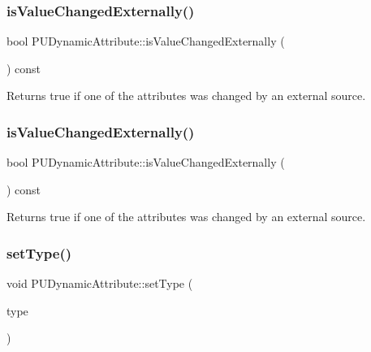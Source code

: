 \mbox{\label{classPUDynamicAttribute_adcf769af69d3508302426d751646425f}} 
\subsubsection{\texorpdfstring{is\+Value\+Changed\+Externally()}{isValueChangedExternally()}\hspace{0.1cm}{\footnotesize\ttfamily [1/2]}}
{\footnotesize\ttfamily bool P\+U\+Dynamic\+Attribute\+::is\+Value\+Changed\+Externally (\begin{DoxyParamCaption}\item[{void}]{ }\end{DoxyParamCaption}) const}

Returns true if one of the attributes was changed by an external source. \mbox{\label{classPUDynamicAttribute_adcf769af69d3508302426d751646425f}} 
\subsubsection{\texorpdfstring{is\+Value\+Changed\+Externally()}{isValueChangedExternally()}\hspace{0.1cm}{\footnotesize\ttfamily [2/2]}}
{\footnotesize\ttfamily bool P\+U\+Dynamic\+Attribute\+::is\+Value\+Changed\+Externally (\begin{DoxyParamCaption}\item[{void}]{ }\end{DoxyParamCaption}) const}

Returns true if one of the attributes was changed by an external source. \mbox{\label{classPUDynamicAttribute_ae8f339de34c30da332fb56648f862594}} 
\subsubsection{\texorpdfstring{set\+Type()}{setType()}\hspace{0.1cm}{\footnotesize\ttfamily [1/2]}}
{\footnotesize\ttfamily void P\+U\+Dynamic\+Attribute\+::set\+Type (\begin{DoxyParamCaption}\item[{P\+U\+Dynamic\+Attribute\+::\+Dynamic\+Attribute\+Type}]{type }\end{DoxyParamCaption})}

